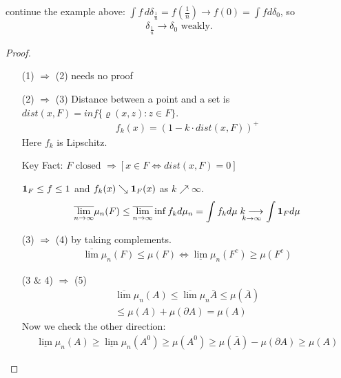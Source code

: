 \documentclass[11pt]{article}
\begin{document}
\begin{example}
    continue the example above: $\int f \, d \delta_{\frac{1}{n}} = f(\frac{1}{n}) \longrightarrow f(0) = \int f d \delta_{0}$, so 
    \begin{align*}
        \delta_{\frac{1}{n}} \longrightarrow \delta_{0} \text{ weakly}.
    \end{align*}
\end{example}

\begin{proof}
    \,

    \begin{enumerate}
        \item[(1) $\Longrightarrow$ (2)] needs no proof 
        \item[(2) $\Longrightarrow$ (3)] Distance between a point and a set  is 
        $dist(x,F) = inf \{ \varrho(x,z): z \in F \}$. 
        \begin{align*}
            f_{k}(x) = (1 - k\cdot dist(x,F))^{+}
        \end{align*}
        Here $f_{k}$ is Lipschitz.
        \begin{remark}
            Key Fact: $F \text{ closed } \Longrightarrow [x \in F \iff dist(x,F) = 0]$
        \end{remark}
        $\bm{1}_{F} \le f \le 1$ and $f_{k}(x) \searrow \bm{1}_{F}(x)$ as $k \nearrow \infty$.
        \begin{align*}
            \overline{\lim_{n \to \infty}}\mu_{n}(F) \le \overline{\lim_{n \to \infty}}
            \inf f_{k} d \mu_{n} = \int f_{k} d \mu \underset{k \to \infty}{k\longrightarrow}
            \int \bm{1}_{F} d \mu
        \end{align*}
        \item[(3) $\Longrightarrow$ (4)] by taking complements. 
        \begin{align*}
            \overline{\lim}\mu_{n}(F) \le \mu(F) \iff 
            \underline{\lim}\mu_{n}(F^{c}) \ge \mu(F^{c})
        \end{align*}
        \item[(3 $\&$ 4) $\Longrightarrow$ (5)] 
        \begin{align*}
            \overline{\lim}\mu_{n}(A) \le \overline{\lim}\mu_{n}\bar{A} \le \mu(\bar{A})\\
            \le \mu(A) + \mu(\partial A) = \mu(A)
        \end{align*}
        Now we check the other direction:
        \begin{align*}
            \underline{\lim}\mu_{n}(A) \ge \underline{\lim}\mu_{n}(A^{0}) \ge \mu(A^{0})
            \ge \mu(\bar{A}) - \mu(\partial A) \ge \mu(A)
        \end{align*}
    \end{enumerate}
\end{proof}
\end{document}
